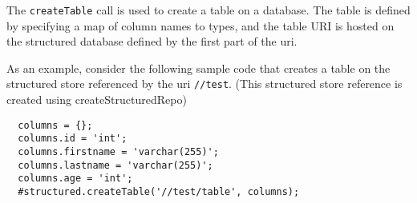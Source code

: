 The \verb+createTable+ call is used to create a table on a database. The table is defined
by specifying a map of column names to types, and the table URI is hosted on the structured
database defined by the first part of the uri.

As an example, consider the following sample \Reflex code that creates a table on
the structured store referenced by the uri \verb+//test+. (This structured store reference
is created using createStructuredRepo)

\begin{Verbatim}
  columns = {};
  columns.id = 'int';
  columns.firstname = 'varchar(255)';
  columns.lastname = 'varchar(255)';
  columns.age = 'int';
  #structured.createTable('//test/table', columns);
\end{Verbatim}

